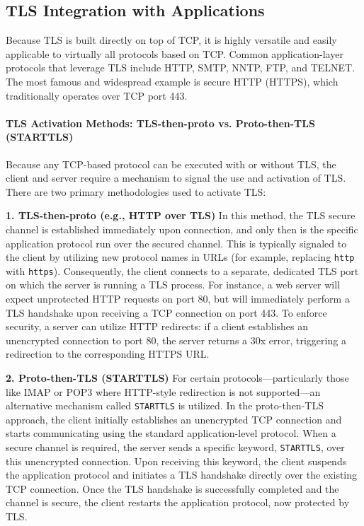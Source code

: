\subsection{TLS Integration with Applications}

Because TLS is built directly on top of TCP, it is highly versatile and easily applicable to virtually all protocols based on TCP. Common application-layer protocols that leverage TLS include HTTP, SMTP, NNTP, FTP, and TELNET. The most famous and widespread example is secure HTTP (HTTPS), which traditionally operates over TCP port 443.

\paragraph{TLS Activation Methods: TLS-then-proto vs. Proto-then-TLS (STARTTLS)}

Because any TCP-based protocol can be executed with or without TLS, the client and server require a mechanism to signal the use and activation of TLS. There are two primary methodologies used to activate TLS:

\textbf{1. TLS-then-proto (e.g., HTTP over TLS)}
In this method, the TLS secure channel is established immediately upon connection, and only then is the specific application protocol run over the secured channel. This is typically signaled to the client by utilizing new protocol names in URLs (for example, replacing \texttt{http} with \texttt{https}). Consequently, the client connects to a separate, dedicated TLS port on which the server is running a TLS process. For instance, a web server will expect unprotected HTTP requests on port 80, but will immediately perform a TLS handshake upon receiving a TCP connection on port 443. To enforce security, a server can utilize HTTP redirects: if a client establishes an unencrypted connection to port 80, the server returns a 30x error, triggering a redirection to the corresponding HTTPS URL.

\textbf{2. Proto-then-TLS (STARTTLS)}
For certain protocols—particularly those like IMAP or POP3 where HTTP-style redirection is not supported—an alternative mechanism called \texttt{STARTTLS} is utilized. In the proto-then-TLS approach, the client initially establishes an unencrypted TCP connection and starts communicating using the standard application-level protocol. When a secure channel is required, the server sends a specific keyword, \texttt{STARTTLS}, over this unencrypted connection. Upon receiving this keyword, the client suspends the application protocol and initiates a TLS handshake directly over the existing TCP connection. Once the TLS handshake is successfully completed and the channel is secure, the client restarts the application protocol, now protected by TLS.


